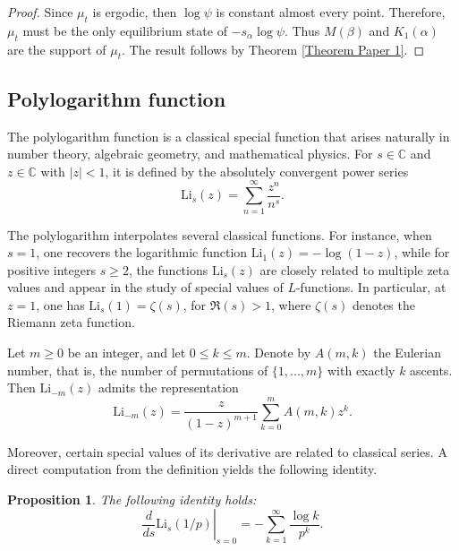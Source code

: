 \documentclass[11pt]{amsart}
\newtheorem{proposition}[theorem]{Proposition}
\theoremstyle{remark}
\numberwithin{equation}{section}
\newcommand{\C}{\mathbb{C}}
\newcommand{\Li}{\mathrm{Li}}
\begin{document}
\begin{proof}
    Since $\mu_{t}$ is ergodic, then $\log\psi$ is constant almost every point. Therefore, $\mu_{t}$ must be the only equilibrium state of $-s_{\alpha}\log\psi$. Thus $M(\beta)$ and $K_{1}(\alpha)$ are the support of $\mu_{t}$. The result follows by Theorem \ref{Theorem Paper 1}.
\end{proof} 


\subsection{Polylogarithm function}
The polylogarithm function is a classical special function that arises naturally in number theory, algebraic geometry, and mathematical physics. For $s\in \C$ and $z\in \C$ with 
$|z|<1$, it is defined by the absolutely convergent power series
\[\Li_s(z)=\sum_{n=1}^\infty \dfrac{z^n}{n^s}.\]

The polylogarithm interpolates several classical
functions. For instance, when $s=1$, one recovers
the logarithmic function $\Li_1(z)=-\log(1-z)$,
while for positive integers $s\geq 2$, the functions $\Li_s(z)$ are closely related to multiple zeta values and appear in the study of special values of 
$L$-functions. In particular, at $z=1$, one has
$\Li_s(1)=\zeta(s)$, for $\Re(s)>1$, where $\zeta(s)$ denotes the Riemann zeta function.

Let $m\geq 0$ be an integer, and let $0\leq k \leq m$. Denote by $A(m,k)$ the Eulerian number, that is, the number of permutations of $\{1,...,m\}$ with exactly $k$ ascents. Then  $\Li_{-m}(z)$ admits the representation
\begin{equation}\label{Li in negative numbers}
\Li_{-m}(z)=\dfrac{z}{(1-z)^{m+1}}\sum_{k=0}^m A(m,k)z^k.  \end{equation}

Moreover,  certain special values of its derivative are related to classical series. A direct computation from the definition yields the following identity.

\begin{proposition}\label{derivative in zero}
The following identity holds:    
\[\left.\dfrac{d}{ds}\Li_s(1/p)\right|_{s=0}=-\sum_{k=1}^\infty \dfrac{\log k}{p^k}.\]
\end{proposition}
    
\end{document}

